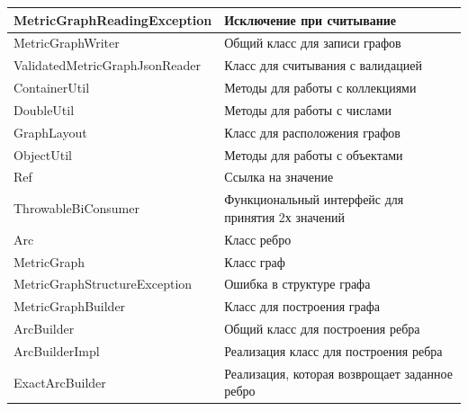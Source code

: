 \documentclass{../TechDoc}
\begin{document}
\begin{tabular}{|l|m{17em}|}
		\hline
		MetricGraphReadingException & Исключение при считывание\\
		\hline
		MetricGraphWriter & Общий класс для записи графов\\
		\hline
		ValidatedMetricGraphJsonReader & Класс для считывания с валидацией\\
		\hline
		ContainerUtil & Методы для работы с коллекциями\\
		\hline
		DoubleUtil & Методы для работы с числами\\
		\hline
		GraphLayout & Класс для расположения графов\\
		\hline
		ObjectUtil & Методы для работы с объектами\\
		\hline
		Ref & Ссылка на значение \\
		\hline
		ThrowableBiConsumer & Функциональный интерфейс для принятия 2х значений\\
		\hline
		Arc & Класс ребро\\
		\hline
		MetricGraph & Класс граф\\
		\hline
		MetricGraphStructureException & Ошибка в структуре графа\\
		\hline
		MetricGraphBuilder & Класс для построения графа\\
		\hline
		ArcBuilder & Общий класс для построения ребра\\
		\hline
		ArcBuilderImpl & Реализация класс для построения ребра\\
		\hline
		ExactArcBuilder & Реализация, которая возврощает заданное ребро\\
		\hline
	\end{tabular}
	
\end{document}
